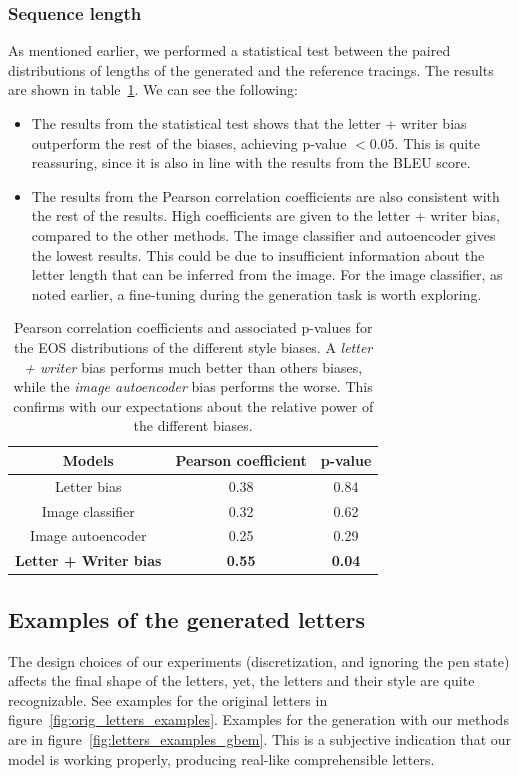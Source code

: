\subsubsection{Sequence length}
\par As mentioned earlier, we performed a statistical test between the paired distributions of lengths of the generated and the reference tracings. The results are shown in table~\ref{table:2}. We can see the following:
\begin{itemize}
    \item The results from the statistical test shows that the letter + writer bias outperform the rest of the biases, achieving p-value $< 0.05$. This is quite reassuring, since it is also in line with the results from the BLEU score.
    \item The results from the Pearson correlation coefficients are also consistent with the rest of the results. High coefficients are given to the letter + writer bias, compared to the other methods. The image classifier and autoencoder gives the lowest results. This could be due to insufficient information about the letter length that can be inferred from the image. For the image classifier, as noted earlier, a fine-tuning during the generation task is worth exploring.
\end{itemize}

\begin{table}[!htbp]
\centering
\begin{tabular}{|c|c|c|}
\hline
Models & Pearson coefficient & p-value \\ \hline
Letter bias & 0.38 & 0.84 \\ \hline
Image classifier & 0.32 & 0.62\\ \hline
Image autoencoder & 0.25 & 0.29 \\ \hline
\textbf{Letter + Writer bias} & \textbf{0.55} & \textbf{0.04}\\ \hline
\end{tabular}
\caption{Pearson correlation coefficients and associated p-values for the EOS distributions of the different style biases. A \textit{letter + writer} bias performs much better than others biases, while the \textit{image autoencoder} bias performs the worse. This confirms with our expectations about the relative power of the different biases.}

\label{table:2}
\end{table}

\subsection{Examples of the generated letters}
\par The design choices of our experiments (discretization, and ignoring the pen state) affects the final shape of the letters, yet, the letters and their style are quite recognizable. See examples for the original letters in figure~\ref{fig:orig_letters_examples}. Examples for the generation with our methods are in figure~\ref{fig:letters_examples_gbem}. This is a subjective indication that our model is working properly, producing real-like comprehensible letters.

